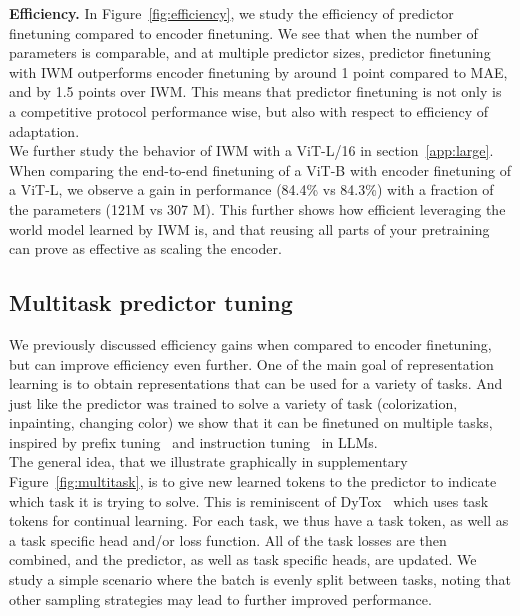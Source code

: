 \documentclass[twocolumn]{fairmeta}
\theoremstyle{plain}
\theoremstyle{definition}
\theoremstyle{remark}
\begin{document}
\textbf{Efficiency.} In Figure~\ref{fig:efficiency}, we study the efficiency of predictor finetuning compared to encoder finetuning. We see that when the number of parameters is comparable, and at multiple predictor sizes, predictor finetuning with IWM outperforms encoder finetuning by around 1 point compared to MAE, and by 1.5 points over IWM. This means that predictor finetuning is not only is a competitive protocol performance wise, but also with respect to efficiency of adaptation. \\
We further study the behavior of IWM with a ViT-L/16 in section~\ref{app:large}. When comparing the end-to-end finetuning of a ViT-B with encoder finetuning of a ViT-L, we observe a gain in performance (84.4\% vs 84.3\%) with a fraction of the parameters (121M vs 307 M). This further shows how efficient leveraging the world model learned by IWM is, and that reusing all parts of your pretraining can prove as effective as scaling the encoder.



\subsection{Multitask predictor tuning}

We previously discussed efficiency gains when compared to encoder finetuning, but can improve efficiency even further. One of the main goal of representation learning is to obtain representations that can be used for a variety of tasks. And just like the predictor was trained to solve a variety of task (colorization, inpainting, changing color) we show that it can be finetuned on multiple tasks, inspired by prefix tuning~\citep{li2021prefixtuning} and instruction tuning~\cite{wei2022instruction,zhang2023instruction} in LLMs.\\
The general idea, that we illustrate graphically in supplementary Figure~\ref{fig:multitask}, is to give new learned tokens to the predictor to indicate which task it is trying to solve. This is reminiscent of DyTox~\cite{douillard2021dytox} which uses task tokens for continual learning. For each task, we thus have a task token, as well as a task specific head and/or loss function. All of the task losses are then combined, and the predictor, as well as task specific heads, are updated. We study a simple scenario where the batch is evenly split between tasks, noting that other sampling strategies may lead to further improved performance.
\end{document}
